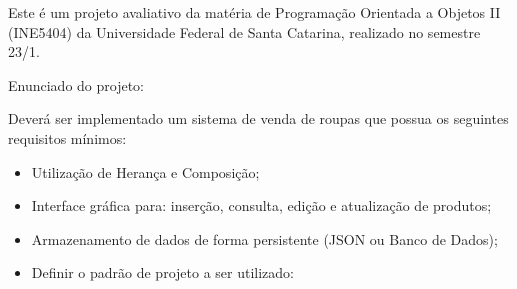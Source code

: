 \documentclass{article}
\begin{document}
Este é um projeto avaliativo da matéria de Programação Orientada a Objetos II (INE5404) da Universidade Federal de Santa Catarina, realizado no semestre 23/1.

Enunciado do projeto:

Deverá ser implementado um sistema de venda de roupas que possua os seguintes requisitos mínimos:

\begin{itemize}
  \item Utilização de Herança e Composição;
  \item Interface gráfica para: inserção, consulta, edição e atualização de produtos;
  \item Armazenamento de dados de forma persistente (JSON ou Banco de Dados);
  \item Definir o padrão de projeto a ser utilizado:
\end{itemize}
\end{document}
